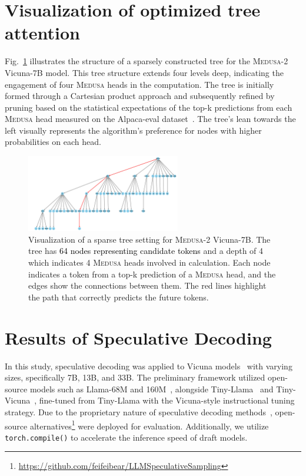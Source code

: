 \documentclass{article}
\theoremstyle{plain}
\theoremstyle{definition}
\theoremstyle{remark}
\newcommand{\ours}
{\textsc{Medusa}\xspace}
\begin{document}
\section{Visualization of optimized tree attention}\label{appendix:sparse_tree}
Fig.~\ref{fig:sparse_tree} illustrates the structure of a sparsely constructed tree for the \ours-2 Vicuna-7B model. This tree structure extends four levels deep, indicating the engagement of four \ours heads in the computation. The tree is initially formed through a Cartesian product approach and subsequently refined by pruning based on the statistical expectations of the top-k predictions from each \ours head measured on the Alpaca-eval dataset~\cite{dubois2023alpacafarm}. The tree's lean towards the left visually represents the algorithm's preference for nodes with higher probabilities on each head.
\begin{figure}[h]
    \centering
    \includegraphics[width=0.6\textwidth]{sparse_tree.pdf}
    \caption{Visualization of a sparse tree setting for \ours-2 Vicuna-7B. The tree has \textcolor{black}{64 nodes representing candidate tokens} and a depth of 4 which indicates 4 \ours heads involved in calculation. Each node indicates a token from a top-k prediction of a \ours head, and the edges show the connections between them. The red lines highlight the path that correctly predicts the future tokens.}
    \label{fig:sparse_tree}
\end{figure}

\section{Results of Speculative Decoding}\label{appendix:spec}

In this study, speculative decoding was applied to Vicuna models~\citep{vicuna2023} with varying sizes, specifically 7B, 13B, and 33B. The preliminary framework utilized open-source models such as Llama-68M and 160M~\citep{miao2023specinfer}, alongside Tiny-Llama~\citep{zhang2024tinyllama} and Tiny-Vicuna~\citep{tiny_vicuna_1b}, fine-tuned from Tiny-Llama with the Vicuna-style instructional tuning strategy. Due to the proprietary nature of speculative decoding methods~\citep{chen2023accelerating, leviathan2022fast}, open-source alternatives\footnote{\href{https://github.com/feifeibear/LLMSpeculativeSampling}{https://github.com/feifeibear/LLMSpeculativeSampling}} were deployed for evaluation. Additionally, we utilize \verb|torch.compile()| to accelerate the inference speed of draft models.
\end{document}
